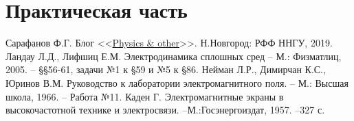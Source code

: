 \section{Практическая часть}%
\label{sec:prakticheskaia_chast_}



\begin{thebibliography}{}
	 Сарафанов Ф.Г. Блог <<\href{http://fedorsarafanov.github.io}{Physics \& other}>>. Н.Новгород: РФФ ННГУ, 2019.
	 Ландау Л.Д., Лифшиц Е.М. Электродинамика сплошных сред -- М.: Физматлиц, 2005. -- \S\S56-61, задачи №1 к \S59 и №5 к \S86.
     Нейман Л.Р., Димирчан К.С., Юринов В.М. Руководство к лаборатории электромагнитного поля. -- М.: Высшая школа, 1966. -- Работа №11.
     Каден Г. Электромагнитные экраны в высокочастотной технике и электросвязи. --М.:Госэнергоиздат, 1957. --327 с.
\end{thebibliography}



